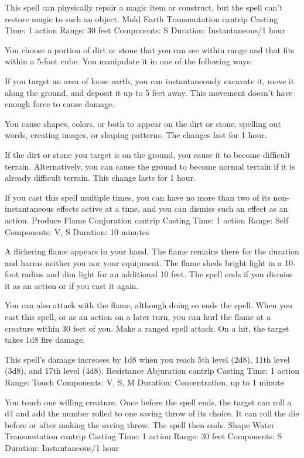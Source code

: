 \documentclass[10pt,twoside,twocolumn]{book}
\begin{document}
This spell can physically repair a magic item or construct, but the spell can't restore magic to such an object.
Mold Earth
Transmutation cantrip
Casting Time: 1 action
Range: 30 feet
Components: S
Duration: Instantaneous/1 hour

You choose a portion of dirt or stone that you can see within range and that fits within a 5-foot cube. You manipulate it in one of the following ways:

    If you target an area of loose earth, you can instantaneously excavate it, move it along the ground, and deposit it up to 5 feet away. This movement doesn't have enough force to cause damage.

    You cause shapes, colors, or both to appear on the dirt or stone, spelling out words, creating images, or shaping patterns. The changes last for 1 hour.

    If the dirt or stone you target is on the ground, you cause it to become difficult terrain. Alternatively, you can cause the ground to become normal terrain if it is already difficult terrain. This change lasts for 1 hour.

If you cast this spell multiple times, you can have no more than two of its non-instantaneous effects active at a time, and you can dismiss such an effect as an action.
Produce Flame
Conjuration cantrip
Casting Time: 1 action
Range: Self
Components: V, S
Duration: 10 minutes

A flickering flame appears in your hand. The flame remains there for the duration and harms neither you nor your equipment. The flame sheds bright light in a 10-foot radius and dim light for an additional 10 feet. The spell ends if you dismiss it as an action or if you cast it again.

You can also attack with the flame, although doing so ends the spell. When you cast this spell, or as an action on a later turn, you can hurl the flame at a creature within 30 feet of you. Make a ranged spell attack. On a hit, the target takes 1d8 fire damage.

This spell's damage increases by 1d8 when you reach 5th level (2d8), 11th level (3d8), and 17th level (4d8).
Resistance
Abjuration cantrip
Casting Time: 1 action
Range: Touch
Components: V, S, M
Duration: Concentration, up to 1 minute

You touch one willing creature. Once before the spell ends, the target can roll a d4 and add the number rolled to one saving throw of its choice. It can roll the die before or after making the saving throw. The spell then ends.
Shape Water
Transmutation cantrip
Casting Time: 1 action
Range: 30 feet
Components: S
Duration: Instantaneous/1 hour
\end{document}
